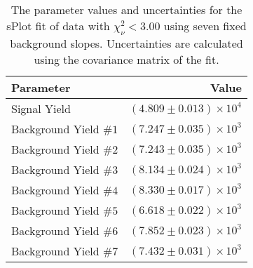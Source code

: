 
\begin{table}[ht]
    \begin{center}
        \begin{tabular}{lr}\toprule
            Parameter & Value \\\midrule
            Signal Yield & $(4.809 \pm 0.013) \times 10^{4}$ \\
            Background Yield $\#1$ & $(7.247 \pm 0.035) \times 10^{3}$ \\
            Background Yield $\#2$ & $(7.243 \pm 0.035) \times 10^{3}$ \\
            Background Yield $\#3$ & $(8.134 \pm 0.024) \times 10^{3}$ \\
            Background Yield $\#4$ & $(8.330 \pm 0.017) \times 10^{3}$ \\
            Background Yield $\#5$ & $(6.618 \pm 0.022) \times 10^{3}$ \\
            Background Yield $\#6$ & $(7.852 \pm 0.023) \times 10^{3}$ \\
            Background Yield $\#7$ & $(7.432 \pm 0.031) \times 10^{3}$ \\\bottomrule
        \end{tabular}
        \caption{The parameter values and uncertainties for the sPlot fit of data with $\chi^2_\nu < 3.00$ using seven fixed background slopes. Uncertainties are calculated using the covariance matrix of the fit.}\label{tab:splot-fit-results-chisqdof-3.00-fixed-7}
    \end{center}
\end{table}
